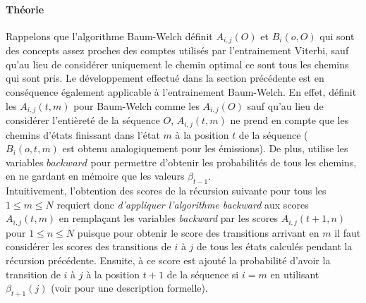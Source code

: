 \documentclass[letterpaper]{article}
\begin{document}
\paragraph{Théorie}
Rappelons que l'algorithme Baum-Welch définit $A_{i,j}(O)$ et $B_i(o, O)$ qui sont des concepts assez proches des comptes utilisés par l'entrainement Viterbi, sauf qu'au lieu de considérer uniquement le chemin optimal ce sont tous les chemins qui sont pris. Le développement effectué dans la section précédente est en conséquence également applicable à l'entrainement Baum-Welch. En effet, \cite{MM} définit les $A_{i,j}(t,m)$ pour Baum-Welch comme les $A_{i,j}(O)$ sauf qu'au lieu de considérer l'entièreté de la séquence $O$, $A_{i,j}(t,m)$ ne prend en compte que les chemins d'états finissant dans l'état $m$ à la position $t$ de la séquence ($B_i(o, t, m)$ est obtenu analogiquement pour les émissions). De plus, \cite{Ch} utilise les variables $backward$ pour permettre d'obtenir les probabilités de tous les chemins, en ne gardant en mémoire que les valeurs $\beta_{t-1}$. \\

Intuitivement, l'obtention des scores de la récursion suivante pour tous les $1 \leq m \leq N$ requiert donc \textit{d'appliquer l'algorithme backward} aux scores $A_{i,j}(t,m)$ en remplaçant les variables \textit{backward} par les scores $A_{i,j}(t+1,n)$ pour $1 \leq n \leq N$ puisque pour obtenir le score des transitions arrivant en $m$ il faut considérer les scores des transitions de $i$ à $j$ de tous les états calculés pendant la récursion précédente. Ensuite, à ce score est ajouté la probabilité d'avoir la transition de $i$ à $j$ à la position $t+1$ de la séquence si $i=m$ en utilisant $\beta_{t+1}(j)$ (voir \cite{Ch} pour une description formelle).
\end{document}
